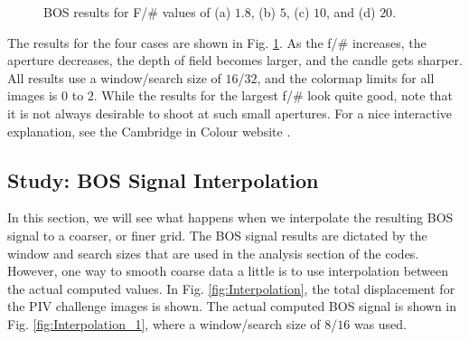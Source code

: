 \documentclass[letterpaper,12pt]{article}
\begin{document}
\begin{figure}[h]
    \caption{BOS results for F/\# values of (a) $1.8$, (b) $5$, (c) $10$, and (d) $20$.}
    \label{fig:FNumber}
\end{figure}

The results for the four cases are shown in Fig. \ref{fig:FNumber}.  As the f/\# increases, the aperture decreases, the depth of field becomes larger, and the candle gets sharper.  All results use a window/search size of $16$/$32$, and the colormap limits for all images is $0$ to $2$.  While the results for the largest f/\# look quite good, note that it is not always desirable to shoot at such small apertures.  For a nice interactive explanation, see the Cambridge in Colour website \cite{Cambridge_in_Colour}.

\subsection{Study: BOS Signal Interpolation}
\label{subsec:BOS_Signal_Interpolation}

In this section, we will see what happens when we interpolate the resulting BOS signal to a coarser, or finer grid.  The BOS signal results are dictated by the window and search sizes that are used in the analysis section of the codes.  However, one way to smooth coarse data a little is to use interpolation between the actual computed values.  In Fig. \ref{fig:Interpolation}, the total displacement for the PIV challenge images is shown.  The actual computed BOS signal is shown in Fig. \ref{fig:Interpolation_1}, where a window/search size of $8$/$16$ was used.
\end{document}
